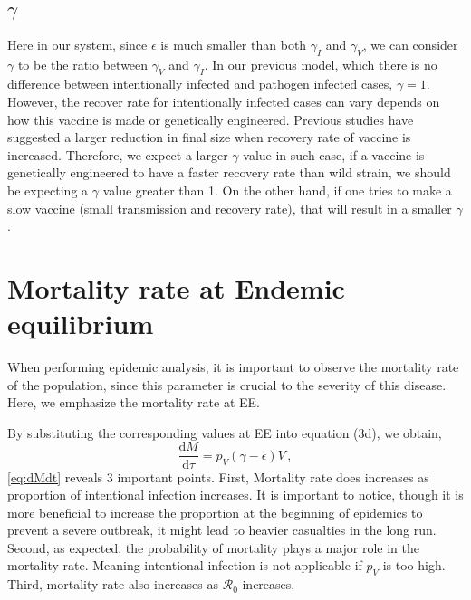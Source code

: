 \documentclass[12pt]{article}
\newcommand\dbyd[2]{\frac{\mathrm d{#1}}{\mathrm d{#2}}}
\newcommand{\R}{\mathcal{R}}
\newcommand{\pmV}{p_{V}}
\begin{document}
\subsection{$\gamma$}
Here in our system, since $\epsilon$ is much smaller than both $\gamma_I$ and $\gamma_V$, we can consider $\gamma$ to be the ratio between $\gamma_V$ and $\gamma_I$. In our previous model, which there is no difference between intentionally infected and pathogen infected cases, $\gamma=1$. However, the recover rate for intentionally infected cases can vary depends on how this vaccine is made or genetically engineered. Previous studies have suggested a larger reduction in final size when recovery rate of vaccine is increased. Therefore, we expect a larger $\gamma$ value in such case, if a vaccine is genetically engineered to have a faster recovery rate than wild strain, we should be expecting a $\gamma$ value greater than 1. On the other hand, if one tries to make a slow vaccine (small transmission and recovery rate), that will result in a smaller $\gamma$.
\section{Mortality rate at Endemic equilibrium}
When performing epidemic analysis, it is important to observe the mortality rate of the population, since this parameter is crucial to the severity of this disease. Here, we emphasize the mortality rate at EE.

By substituting the corresponding values at EE into equation (3d), we obtain,
\begin{equation}
\dbyd{M}{\tau}=\pmV(\gamma-\epsilon)V\,, \label{eq:dMdt}
\end{equation}
\autoref{eq:dMdt} reveals 3 important points. First, Mortality rate does increases as proportion of intentional infection increases. It is important to notice, though it is more beneficial to increase the proportion at the beginning of epidemics to prevent a severe outbreak, it might lead to heavier casualties in the long run. Second, as expected, the probability of mortality plays a major role in the mortality rate. Meaning intentional infection is not applicable if $\pmV$ is too high. Third, mortality rate also increases as $\R_0$ increases. 
\end{document}
